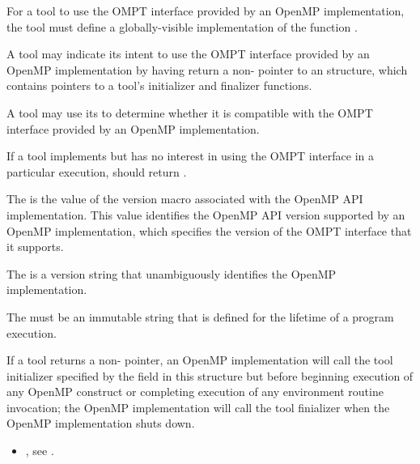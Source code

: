 \descr
For a tool to use the OMPT interface provided by an OpenMP implementation,
the tool must define a globally-visible implementation of the
function .

A tool may indicate its intent to use the OMPT interface provided
by an OpenMP implementation by having
 return a non- pointer to an
 structure, which contains pointers to
a tool's initializer and finalizer functions.

A tool may use its \callbackarg{}  to determine
whether it is compatible with the OMPT interface provided by an OpenMP
implementation.

If a tool implements  but has no interest in using
the OMPT interface in a particular execution,
 should return . 

\argdesc

The \callbackarg{}  
is the value of the  version macro 
associated with the OpenMP API implementation. This value 
identifies the OpenMP API version supported by an OpenMP implementation,
which specifies the version of the OMPT interface that it supports.

The \callbackarg{} 
is a version string that unambiguously identifies the OpenMP implementation.

\constraints

The \callbackarg{}  must be
an immutable string that is defined for the lifetime of a program
execution.

\effect
If a tool returns a non- pointer,
an OpenMP implementation will call the tool initializer specified by the
 field in this structure but before
beginning execution of any OpenMP construct
or completing execution of any environment routine invocation; the
OpenMP implementation will call the tool finializer when the OpenMP
implementation shuts down.



\crossreferences
\begin{itemize}
    \item {}, see .
\end{itemize}

